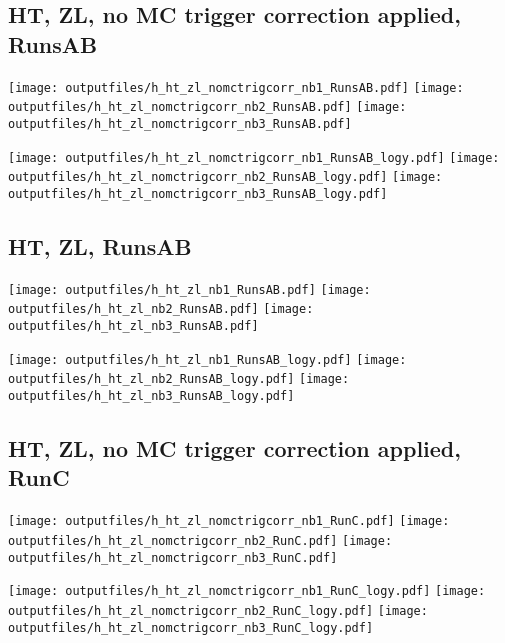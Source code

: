 \documentclass[11pt]{article}
\begin{document}
     \subsection{ HT, ZL, no MC trigger correction applied, RunsAB}

    \noindent
     \texttt{[image: outputfiles/h\_ht\_zl\_nomctrigcorr\_nb1\_RunsAB.pdf]}
     \texttt{[image: outputfiles/h\_ht\_zl\_nomctrigcorr\_nb2\_RunsAB.pdf]}
     \texttt{[image: outputfiles/h\_ht\_zl\_nomctrigcorr\_nb3\_RunsAB.pdf]}

    \noindent
     \texttt{[image: outputfiles/h\_ht\_zl\_nomctrigcorr\_nb1\_RunsAB\_logy.pdf]}
     \texttt{[image: outputfiles/h\_ht\_zl\_nomctrigcorr\_nb2\_RunsAB\_logy.pdf]}
     \texttt{[image: outputfiles/h\_ht\_zl\_nomctrigcorr\_nb3\_RunsAB\_logy.pdf]}


     \subsection{ HT, ZL, RunsAB}

    \noindent
     \texttt{[image: outputfiles/h\_ht\_zl\_nb1\_RunsAB.pdf]}
     \texttt{[image: outputfiles/h\_ht\_zl\_nb2\_RunsAB.pdf]}
     \texttt{[image: outputfiles/h\_ht\_zl\_nb3\_RunsAB.pdf]}

    \noindent
     \texttt{[image: outputfiles/h\_ht\_zl\_nb1\_RunsAB\_logy.pdf]}
     \texttt{[image: outputfiles/h\_ht\_zl\_nb2\_RunsAB\_logy.pdf]}
     \texttt{[image: outputfiles/h\_ht\_zl\_nb3\_RunsAB\_logy.pdf]}


   \clearpage



     \subsection{ HT, ZL, no MC trigger correction applied, RunC}

    \noindent
     \texttt{[image: outputfiles/h\_ht\_zl\_nomctrigcorr\_nb1\_RunC.pdf]}
     \texttt{[image: outputfiles/h\_ht\_zl\_nomctrigcorr\_nb2\_RunC.pdf]}
     \texttt{[image: outputfiles/h\_ht\_zl\_nomctrigcorr\_nb3\_RunC.pdf]}

    \noindent
     \texttt{[image: outputfiles/h\_ht\_zl\_nomctrigcorr\_nb1\_RunC\_logy.pdf]}
     \texttt{[image: outputfiles/h\_ht\_zl\_nomctrigcorr\_nb2\_RunC\_logy.pdf]}
     \texttt{[image: outputfiles/h\_ht\_zl\_nomctrigcorr\_nb3\_RunC\_logy.pdf]}
\end{document}

